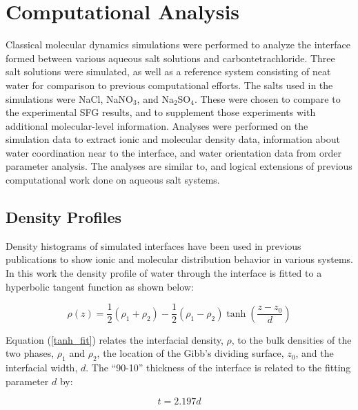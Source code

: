 \section{Computational Analysis}

Classical molecular dynamics simulations were performed to analyze the interface formed between various aqueous salt solutions and carbontetrachloride. Three salt solutions were simulated, as well as a reference system consisting of neat water for comparison to previous computational efforts.\cite{Hore2007,Hore2008,Hore2007a,Walker2006b,Walker2007a,Walker2007b} The salts used in the simulations were NaCl, NaNO$_3$, and Na$_2$SO$_4$. These were chosen to compare to the experimental SFG results, and to supplement those experiments with additional molecular-level information. Analyses were performed on the simulation data to extract ionic and molecular density data, information about water coordination near to the interface, and water orientation data from order parameter analysis. The analyses are similar to, and logical extensions of previous computational work done on aqueous salt systems.

\subsection{Density Profiles}
Density histograms of simulated interfaces have been used in previous publications to show ionic and molecular distribution behavior in various systems.\cite{Chang1995,Eggimann2008,Du2008,Wick2006c,Petersen2005a,Hore2008,Walker2006b,Walker2007b} In this work the density profile of water through the interface is fitted to a hyperbolic tangent function\cite{Wick2006c,MATSUMOTO1988} as shown below:

\begin{equation}\label{tanh_fit}
	\rho(z) = \frac12(\rho_1+\rho_2) - \frac12\left(\rho_1-\rho_2\right)\tanh\left(\frac{z-z_0}{d}\right)
\end{equation}

Equation (\ref{tanh_fit}) relates the interfacial density, $\rho$, to the bulk densities of the two phases, $\rho_1$ and $\rho_2$, the location of the Gibb's dividing surface, $z_0$, and the interfacial width, $d$. The ``90-10'' thickness of the interface is related to the fitting parameter $d$ by:

\begin{equation}\label{90-10}
	t = 2.197d
\end{equation}

